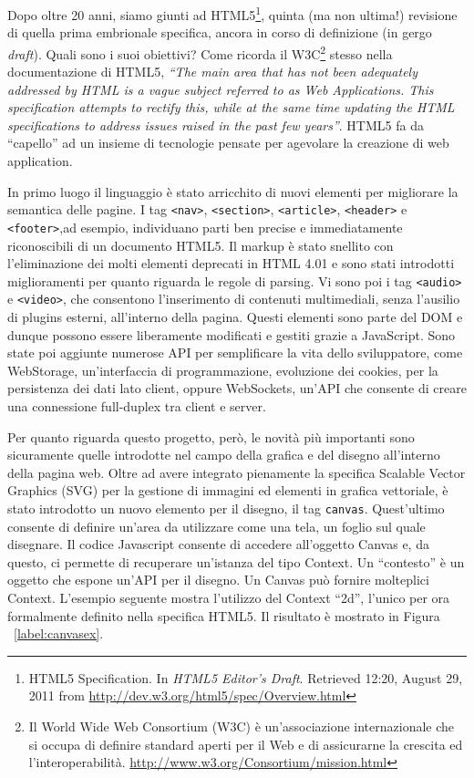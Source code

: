 Dopo oltre 20 anni, siamo giunti ad HTML5\footnote{HTML5 Specification. In \textit{HTML5 Editor's Draft}. Retrieved 12:20, August 29, 2011 from \url{http://dev.w3.org/html5/spec/Overview.html}}, quinta (ma non ultima!) revisione di quella prima embrionale specifica, ancora in corso di definizione (in gergo \textit{draft}). Quali sono i suoi obiettivi? Come ricorda il W3C\footnote{Il World Wide Web Consortium (W3C) è un'associazione internazionale che si occupa di definire standard aperti per il Web e di assicurarne la crescita ed l'interoperabilità. \url{http://www.w3.org/Consortium/mission.html}} stesso nella documentazione di HTML5, \textit{“The main area that has not been adequately addressed by HTML is a vague subject referred to as Web Applications. This specification attempts to rectify this, while at the same time updating the HTML specifications to address issues raised in the past few years”}. HTML5 fa da “capello” ad un insieme di tecnologie pensate per agevolare la creazione di web application.

In primo luogo il linguaggio è stato arricchito di nuovi elementi per migliorare la semantica delle pagine. I tag \texttt{<nav>}, \texttt{<section>}, \texttt{<article>}, \texttt{<header>} e \texttt{<footer>},ad esempio, individuano parti ben precise e immediatamente riconoscibili di un documento HTML5. Il markup è stato snellito con l'eliminazione dei molti elementi deprecati in HTML 4.01 e sono stati introdotti miglioramenti per quanto riguarda le regole di parsing. Vi sono poi i tag \texttt{<audio>} e \texttt{<video>}, che consentono l'inserimento di contenuti multimediali, senza l'ausilio di plugins esterni, all'interno della pagina. Questi elementi sono parte del DOM e dunque possono essere liberamente modificati e gestiti grazie a JavaScript. Sono state poi aggiunte numerose API per semplificare la vita dello sviluppatore, come WebStorage, un'interfaccia di programmazione, evoluzione dei cookies, per la persistenza dei dati lato client, oppure WebSockets, un'API che consente di creare una connessione full-duplex tra client e server. 

Per quanto riguarda questo progetto, però, le novità più importanti sono sicuramente quelle introdotte nel campo della grafica e del disegno all'interno della pagina web. Oltre ad avere integrato pienamente la specifica Scalable Vector Graphics (SVG) per la gestione di immagini ed elementi in grafica vettoriale, è stato introdotto un nuovo elemento per il disegno, il tag \texttt{canvas}. Quest'ultimo consente di definire un'area da utilizzare come una tela, un foglio sul quale disegnare. Il codice Javascript consente di accedere all'oggetto Canvas e, da questo, ci permette di recuperare un'istanza del tipo Context. Un ``contesto'' è un oggetto che espone un'API per il disegno. Un Canvas può fornire molteplici Context. L'esempio seguente mostra l'utilizzo del Context ``2d'', l'unico per ora formalmente definito nella specifica HTML5. Il risultato è mostrato in Figura ~\ref{label:canvasex}.

